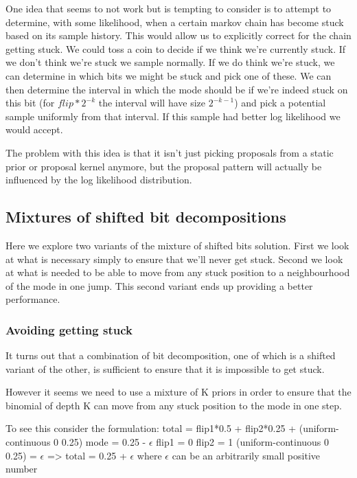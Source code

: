 One idea that seems to not work but is tempting to consider is to attempt to determine, with some likelihood, when a certain markov chain has become stuck based on its sample history. This would allow us to explicitly correct for the chain getting stuck. We could toss a coin to decide if we think we're currently stuck. If we don't think we're stuck we sample normally. If we do think we're stuck, we can determine in which bits we might be stuck and pick one of these. We can then determine the interval in which the mode should be if we're indeed stuck on this bit (for $flip*2^{-k}$ the interval will have size $2^{-k-1}$) and pick a potential sample uniformly from that interval. If this sample had better log likelihood we would accept. 

The problem with this idea is that it isn't just picking proposals from a static prior or proposal kernel anymore, but the proposal pattern will actually be influenced by the log likelihood distribution. 

\subsection{Mixtures of shifted bit decompositions}

Here we explore two variants of the mixture of shifted bits solution. First we look at what is necessary simply to ensure that we'll never get stuck. Second we look at what is needed to be able to move from any stuck position to a neighbourhood of the mode in one jump. This second variant ends up providing a better performance.

\subsubsection{Avoiding getting stuck}

It turns out that a combination of bit decomposition, one of which is a shifted variant of the other, is sufficient to ensure that it is impossible to get stuck.

However it seems we need to use a mixture of K priors in order to ensure that the binomial of depth K can move from any stuck position to the mode in one step. 

To see this consider the formulation:
total = flip1*0.5 + flip2*0.25 + (uniform-continuous 0 0.25)
mode = 0.25 - $\epsilon$
flip1 = 0
flip2 = 1
(uniform-continuous 0 0.25) = $\epsilon$ 
=> total = 0.25 + $\epsilon$
where $\epsilon$ can be an arbitrarily small positive number

